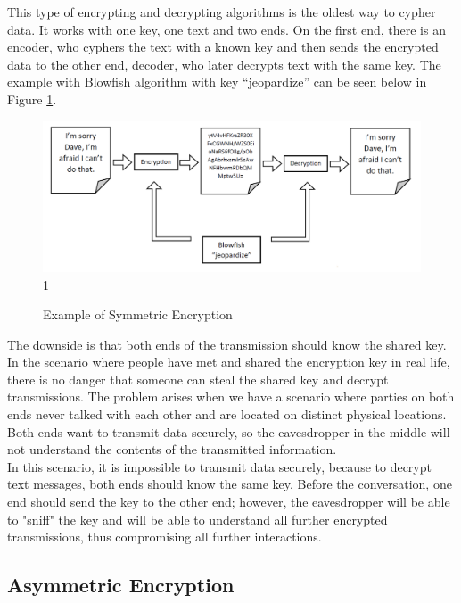 \documentclass[a4paper, 12pt]{article}
\begin{document}
This type of encrypting and decrypting algorithms is the oldest way to cypher data. It works with
one key, one text and two ends. On the first end, there is an encoder, who cyphers the text with a
known key and then sends the encrypted data to the other end, decoder, who later decrypts text
with the same key. The example with Blowfish\cite{blowfish} algorithm with key
“jeopardize” can be seen below in Figure \ref{fig:symmetric}.

\begin{figure}[ht]
  \begin{center}
    \includegraphics[width=\textwidth]{symmetric.png}1
    \caption{Example of Symmetric Encryption}
    \label{fig:symmetric}
    \end{center}
  \end{figure}

The downside is that both ends of the transmission should know the shared key. In the scenario where
people have met and shared the encryption key in real life, there is no danger that someone can
steal the shared key and decrypt transmissions. The problem arises when we have a scenario where
parties on both ends never talked with each other and are located on distinct physical locations.
Both ends want to transmit data securely, so the eavesdropper in the
middle will not understand the contents of the transmitted information.\\

In this scenario, it is
impossible to transmit data securely, because to decrypt text messages, both ends should know
the same key. Before the conversation, one end should send the key to the other end; however,
the eavesdropper will be able to "sniff" the key and will be able to understand all further encrypted
transmissions, thus compromising all further interactions.\\

\subsection{Asymmetric Encryption}
\label{bsec:asymmetric}
\end{document}
